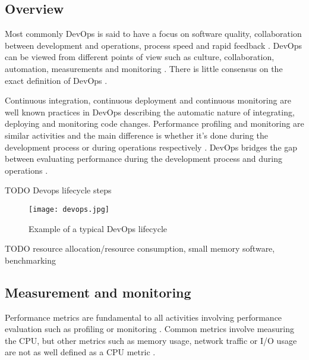 \subsection{Overview}

Most commonly DevOps is said to have a focus on software quality, collaboration between development and operations, process speed and rapid feedback \parencite{mishraDevOpsSoftwareQuality2020,wallerIncludingPerformanceBenchmarks2015, pereraImproveSoftwareQuality2017}. DevOps can be viewed from different points of view such as culture, collaboration, automation, measurements and monitoring \parencite{mishraDevOpsSoftwareQuality2020, wallerIncludingPerformanceBenchmarks2015}. There is little consensus on the exact definition of DevOps \parencite{smedsDevOpsDefinitionPerceived2015}.



Continuous integration, continuous deployment and continuous monitoring are well known practices in DevOps \parencite{wallerIncludingPerformanceBenchmarks2015} describing the automatic nature of integrating, deploying and monitoring code changes. Performance profiling and monitoring are similar activities and the main difference is whether it's done during the development process or during operations respectively \parencite{wallerIncludingPerformanceBenchmarks2015}. DevOps bridges the gap between evaluating performance during the development process and during operations \parencite{brunnertPerformanceorientedDevOpsResearch2015}.

TODO Devops lifecycle steps

\begin{figure}[h]
    \centering
    \texttt{[image: devops.jpg]}
    \caption{Example of a typical DevOps lifecycle}
    \label{fig:devops}
\end{figure}


TODO resource allocation/resource consumption, small memory software, benchmarking

\subsection{Measurement and monitoring}

Performance metrics are fundamental to all activities involving performance evaluation such as profiling or monitoring \parencite{brunnertPerformanceorientedDevOpsResearch2015}. Common metrics involve measuring the CPU, but other metrics such as memory usage, network traffic or I/O usage are not as well defined as a CPU metric \parencite{brunnertPerformanceorientedDevOpsResearch2015}.

